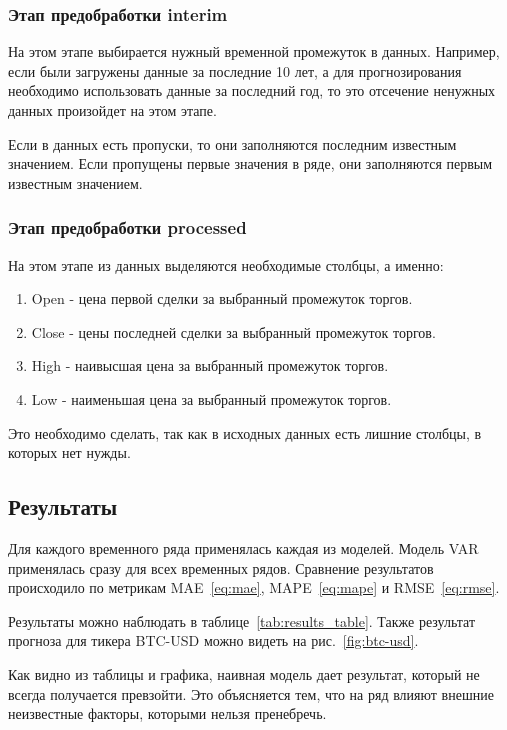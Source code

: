 \documentclass[a4paper,article,14pt]{extarticle}
\begin{document}
\subsubsection{Этап предобработки interim}
На этом этапе выбирается нужный временной промежуток в данных.
Например, если были загружены данные за последние 10 лет, а для прогнозирования необходимо использовать данные за последний год, то это отсечение ненужных данных произойдет на этом этапе.
\par

Если в данных есть пропуски, то они заполняются последним известным значением.
Если пропущены первые значения в ряде, они заполняются первым известным значением.

\subsubsection{Этап предобработки processed}

На этом этапе из данных выделяются необходимые столбцы, а именно:
\begin{enumerate}
    \item Open - цена первой сделки за выбранный промежуток торгов.
    \item Close - цены последней сделки за выбранный промежуток торгов.
    \item High - наивысшая цена за выбранный промежуток торгов.
    \item Low - наименьшая цена за выбранный промежуток торгов.
\end{enumerate}
\par

Это необходимо сделать, так как в исходных данных есть лишние столбцы, в которых нет нужды.

\subsection{Результаты}
Для каждого временного ряда применялась каждая из моделей.
Модель VAR применялась сразу для всех временных рядов.
Сравнение результатов происходило по метрикам MAE~\eqref{eq:mae}, MAPE~\eqref{eq:mape} и RMSE~\eqref{eq:rmse}.

Результаты можно наблюдать в таблице~\ref{tab:results_table}.
Также результат прогноза для тикера BTC-USD можно видеть на рис.~\ref{fig:btc-usd}.


Как видно из таблицы и графика, наивная модель дает результат, который не всегда получается превзойти.
Это объясняется тем, что на ряд влияют внешние неизвестные факторы, которыми нельзя пренебречь.
\end{document}
